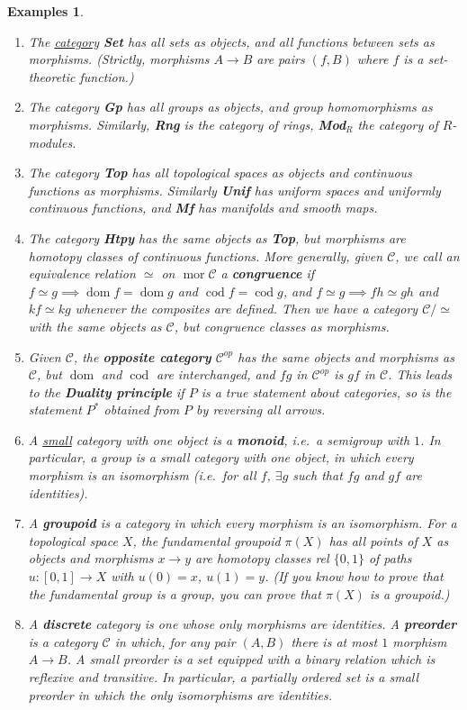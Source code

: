 \documentclass{article}
\DeclareMathOperator{\mor}{mor}
\DeclareMathOperator{\dom}{dom}
\DeclareMathOperator{\cod}{cod}
\newtheorem{nexample}[nthm]{Examples}
\begin{document}
\begin{nexample}\leavevmode
  \begin{enumerate}[label=(\alph*)]
    \item The \hyperlink{def:cat}{category} \textbf{Set} has all sets as objects, and all functions between sets as morphisms.
      (Strictly, morphisms $A \to B$ are pairs $(f,B)$ where $f$ is a set-theoretic function.)
    \item The category \textbf{Gp} has all groups as objects, and group homomorphisms as morphisms. Similarly, \textbf{Rng} is the category of rings, \textbf{Mod}$_R$ the category of $R$-modules.
    \item The category \textbf{Top} has all topological spaces as objects and continuous functions as morphisms. Similarly \textbf{Unif} has uniform spaces and uniformly continuous functions, and \textbf{Mf} has manifolds and smooth maps.
    \item The category \textbf{Htpy} has the same objects as \textbf{Top}, but morphisms are homotopy classes of continuous functions.
      More generally, given $\mathscr{C}$, we call an equivalence relation $\simeq$ on $\mor \mathscr{C}$ a \textbf{congruence} if $f \simeq g \implies \dom f = \dom g$ and $\cod f = \cod g$, and $f \simeq g \implies f h \simeq g h$ and $k f \simeq k g$ whenever the composites are defined. Then we have a category $\mathscr{C}/\simeq$ with the same objects as $\mathscr{C}$, but congruence classes as morphisms.
    \item {}Given $\mathscr{C}$, the \textbf{opposite category} $\mathscr{C}^{op}$ has the same objects and morphisms as $\mathscr{C}$, but $\dom$ and $\cod$ are interchanged, and $f g $ in $\mathscr{C}^{op}$ is $gf$ in $\mathscr{C}$.
      This leads to the \textbf{Duality principle} if $P$ is a true statement about categories, so is the statement $P^*$ obtained from $P$ by reversing all arrows.
    \item A \hyperlink{def:small}{small} category with one object is a \textbf{monoid}, i.e.\ a semigroup with $1$. In particular, a group is a small category with one object, in which every morphism is an isomorphism (i.e.\ for all $f$, $\exists g$ such that $fg$ and $gf$ are identities).
    \item A \textbf{groupoid} is a category in which every morphism is an isomorphism. For a topological space $X$, the fundamental groupoid $\pi(X)$ has all points of $X$ as objects and morphisms $x \to y$ are homotopy classes rel $\{0,1\}$ of paths $u: [0,1] \to X$ with $u(0) = x$, $u(1) = y$.
      (If you know how to prove that the fundamental group is a group, you can prove that $\pi(X)$ is a groupoid.)
    \item A \textbf{discrete} category is one whose only morphisms are identities. A \textbf{preorder} is a category $\mathscr{C}$ in which, for any pair $(A,B)$ there is at most $1$ morphism $A \to B$.
      A small preorder is a set equipped with a binary relation which is reflexive and transitive.
      In particular, a partially ordered set is a small preorder in which the only isomorphisms are identities.
  \end{enumerate}
\end{nexample}

\printindex
\end{document}
